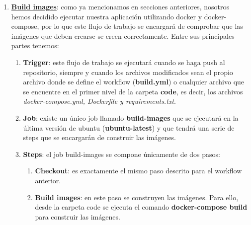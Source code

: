 \begin{enumerate}
        \item \textbf{\href{https://github.com/alexespana/TFG/actions/workflows/build.yml}
        {Build images}}: como ya mencionamos en secciones anteriores, nosotros hemos decidido
        ejecutar nuestra aplicación utilizando docker y docker-compose, por lo que este flujo
        de trabajo se encargará de comprobar que las imágenes que deben crearse se creen
        correctamente. Entre sus principales partes tenemos:
            \begin{enumerate}
                \item \textbf{Trigger}: este flujo de trabajo se ejecutará cuando se haga
                push al repositorio, siempre y cuando los archivos modificados sean el propio
                archivo donde se define el workflow (\textbf{build.yml}) o cualquier archivo
                que se encuentre en el primer nivel de la carpeta \textbf{code}, es decir, los
                archivos \textit{docker-compose.yml, Dockerfile y requirements.txt}.
                \item \textbf{Job}: existe un único job llamado \textbf{build-images} que se
                ejecutará en la última versión de ubuntu (\textbf{ubuntu-latest}) y que
                tendrá una serie de steps que se encargarán de construir las imágenes.
                \item \textbf{Steps}: el job build-images se compone únicamente de dos pasos:
                    \begin{enumerate}
                        \item \textbf{Checkout}: es exactamente el mismo paso descrito para
                        el workflow anterior.
                        \item \textbf{Build images}: en este paso se construyen las
                        imágenes. Para ello, desde la carpeta code se ejecuta el comando
                        \textbf{docker-compose build} para construir las imágenes.
                    \end{enumerate}
            \end{enumerate}


\end{enumerate}
